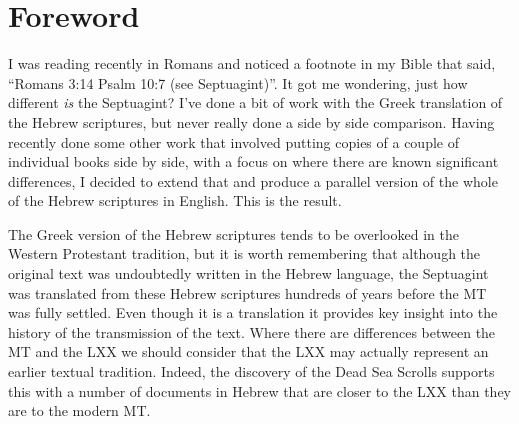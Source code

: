 \cleardoublepage
\section*{Foreword}
{\large
{
\setlength{\parindent}{2em}
I was reading recently in Romans and noticed a footnote in my Bible that said, ``Romans 3:14 Psalm 10:7 (see Septuagint)''. It got me wondering, just how different \textit{is} the Septuagint? I've done a bit of work with the Greek translation of the Hebrew scriptures, but never really done a side by side comparison. Having recently done some other work that involved putting copies of a couple of individual books side by side, with a focus on where there are known significant differences, I decided to extend that and produce a parallel version of the whole of the Hebrew scriptures in English. This is the result.

The Greek version of the Hebrew scriptures tends to be overlooked in the Western Protestant tradition, but it is worth remembering that although the original text was undoubtedly written in the Hebrew language, the Septuagint was translated from these Hebrew scriptures hundreds of years before the MT was fully settled. Even though it is a translation it provides key insight into the history of the transmission of the text. Where there are differences between the MT and the LXX we should consider that the LXX may actually represent an earlier textual tradition. Indeed, the discovery of the Dead Sea Scrolls supports this with a number of documents in Hebrew that are closer to the LXX than they are to the modern MT.

}}
